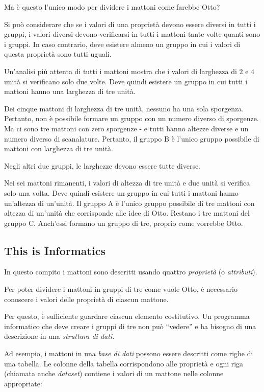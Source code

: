 \documentclass[a4paper,11pt]{report}
\begin{document}
Ma è questo l’unico modo per dividere i mattoni come farebbe Otto?

Si può considerare che se i valori di una proprietà devono essere diversi in tutti i gruppi, i valori diversi devono verificarsi in tutti i mattoni tante volte quanti sono i gruppi. In caso contrario, deve esistere almeno un gruppo in cui i valori di questa proprietà sono tutti uguali.

Un’analisi più attenta di tutti i mattoni mostra che i valori di larghezza di $2$ e $4$ unità si verificano solo due volte. Deve quindi esistere un gruppo in cui tutti i mattoni hanno una larghezza di tre unità.

Dei cinque mattoni di larghezza di tre unità, nessuno ha una sola sporgenza. Pertanto, non è possibile formare un gruppo con un numero diverso di sporgenze. Ma ci sono tre mattoni con zero sporgenze - e tutti hanno altezze diverse e un numero diverso di scanalature. Pertanto, il gruppo B è l’unico gruppo possibile di mattoni con larghezza di tre unità.

Negli altri due gruppi, le larghezze devono essere tutte diverse.

Nei sei mattoni rimanenti, i valori di altezza di tre unità e due unità si verifica solo una volta. Deve quindi esistere un gruppo in cui tutti i mattoni hanno un’altezza di un’unità. Il gruppo A è l’unico gruppo possibile di tre mattoni con altezza di un’unità che corrisponde alle idee di Otto. Restano i tre mattoni del gruppo C. Anch’essi formano un gruppo di tre, proprio come vorrebbe Otto.


\subsection*{This is Informatics}

In questo compito i mattoni sono descritti usando quattro \emph{proprietà} (o \emph{attributi}).

Per poter dividere i mattoni in gruppi di tre come vuole Otto, è necessario conoscere i valori delle proprietà di ciascun mattone.

Per questo, è sufficiente guardare ciascun elemento costitutivo. Un programma informatico che deve creare i gruppi di tre non può \enquote{vedere} e ha bisogno di una descrizione in una \emph{struttura di dati}.

Ad esempio, i mattoni in una \emph{base di dati} possono essere descritti come righe di una tabella. Le colonne della tabella corrispondono alle proprietà e ogni riga (chiamata anche \emph{dataset}) contiene i valori di un mattone nelle colonne appropriate:
\end{document}

